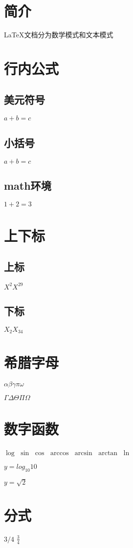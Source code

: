 \documentclass{ctexart}
\begin{document}
	\section{简介}
		\LaTeX{}文档分为数学模式和文本模式
		
	\section{行内公式}
	\subsection{美元符号}
		$a + b = c$
	\subsection{小括号}
		\( a + b = c \)
	\subsection{math环境}
		\begin{math}
			 1 + 2 = 3
		\end{math}
	\section{上下标}
	\subsection{上标}
		$X^2 X^{29}$
	\subsection{下标}
		$X_2 X_{34}$
	\section{希腊字母}
		$\alpha	\beta	\gamma	\pi	\omega$	
		
		$\Gamma	\Delta	\Theta	\Pi	\Omega$ 
	\section{数字函数}
		$\log$		$\sin$		$\cos$		$\arccos$	$\arcsin$		$\arctan$		$\ln$
		
		$y = log_{10} 10$
		
		$y = \sqrt{2}$
		
	\section{分式}
		$3/4$	%
		$\frac{3}{4}$	%
		
\end{document}
